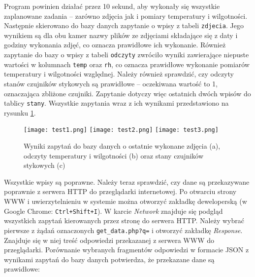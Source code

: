 \documentclass[a4paper,11pt,twoside]{article}
\begin{document}
Program powinien działać przez 10 sekund, aby wykonały się wszystkie zaplanowane zadania -- zarówno zdjęcia jak i pomiary temperatury i wilgotności. Następnie skierowano do bazy danych zapytanie o wpisy z tabeli \texttt{zdjecia}. Jego wynikiem są dla obu kamer nazwy plików ze zdjęciami składające się z daty i godziny wykonania zdjęć, co oznacza prawidłowe ich wykonanie. Również zapytanie do bazy o wpisy z tabeli \texttt{odczyty} zwróciło wyniki zawierające niepuste wartości w kolumnach \texttt{temp} oraz \texttt{rh}, co oznacza prawidłowe wykonanie pomiarów temperatury i wilgotności względnej. Należy również sprawdzić, czy odczyty stanów czujników stykowych są prawidłowe -- oczekiwana wartość to 1, oznaczająca zbliżone czujniki. Zapytanie dotyczy więc ostatnich dwóch wpisów do tablicy \texttt{stany}. Wszystkie zapytania wraz z ich wynikami przedstawiono na rysunku \ref{fig: test1}.
\begin{figure}
\begin{center}
\texttt{[image: test1.png]}
\texttt{[image: test2.png]}
\texttt{[image: test3.png]}
\caption{Wyniki zapytań do bazy danych o ostatnie wykonane zdjęcia (a), odczyty temperatury i wilgotności (b) oraz stany czujników stykowych (c)}
\label{fig: test1}
\end{center}
\end{figure}

Wszystkie wpisy są poprawne. Należy teraz sprawdzić, czy dane są przekazywane poprawnie z serwera HTTP do przeglądarki internetowej. Po otwarciu strony WWW i uwierzytelnieniu w systemie można otworzyć zakładkę deweloperską  
(w Google Chrome: \texttt{Ctrl+Shift+I}). W karcie \textit{Network} znajduje się podgląd wszystkich zapytań kierowanych przez stronę do serwera HTTP. Należy wybrać pierwsze z żądań oznaczonych \texttt{get{\_}data.php?q=} i otworzyć zakładkę \textit{Response}. Znajduje się w niej treść odpowiedzi przekazanej z serwera WWW do przeglądarki. Porównanie wybranych fragmentów odpowiedzi w formacie JSON z wynikami zapytań do bazy danych potwierdza, że przekazane dane są prawidłowe:
\end{document}
